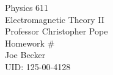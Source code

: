 \begin{titlepage}
\setlength{\topmargin}{1.5in}
\begin{center}
\Huge{Physics 611} \\
\LARGE{Electromagnetic Theory II} \\
\Large{Professor Christopher Pope} \\[1cm]

\huge{Homework \#\HWnum}\\[0.5cm]

\large{Joe Becker} \\
\large{UID: 125-00-4128} \\
\large{\due} 

\end{center}

\end{titlepage}
